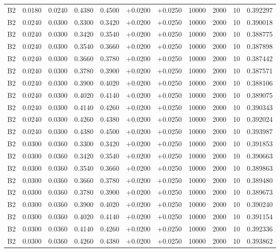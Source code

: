\documentclass{article}
\begin{document}
\begin{longtable}{l r r r r r r r r r l}
B2 & 0.0180 & 0.0240 & 0.4380 & 0.4500 & +0.0200 & +0.0250 & 10000 & 2000 & 10 & 0.392297 \\
B2 & 0.0240 & 0.0300 & 0.3300 & 0.3420 & +0.0200 & +0.0250 & 10000 & 2000 & 10 & 0.390018 \\
B2 & 0.0240 & 0.0300 & 0.3420 & 0.3540 & +0.0200 & +0.0250 & 10000 & 2000 & 10 & 0.388775 \\
B2 & 0.0240 & 0.0300 & 0.3540 & 0.3660 & +0.0200 & +0.0250 & 10000 & 2000 & 10 & 0.387898 \\
B2 & 0.0240 & 0.0300 & 0.3660 & 0.3780 & +0.0200 & +0.0250 & 10000 & 2000 & 10 & 0.387442 \\
B2 & 0.0240 & 0.0300 & 0.3780 & 0.3900 & +0.0200 & +0.0250 & 10000 & 2000 & 10 & 0.387571 \\
B2 & 0.0240 & 0.0300 & 0.3900 & 0.4020 & +0.0200 & +0.0250 & 10000 & 2000 & 10 & 0.388106 \\
B2 & 0.0240 & 0.0300 & 0.4020 & 0.4140 & +0.0200 & +0.0250 & 10000 & 2000 & 10 & 0.389075 \\
B2 & 0.0240 & 0.0300 & 0.4140 & 0.4260 & +0.0200 & +0.0250 & 10000 & 2000 & 10 & 0.390343 \\
B2 & 0.0240 & 0.0300 & 0.4260 & 0.4380 & +0.0200 & +0.0250 & 10000 & 2000 & 10 & 0.392024 \\
B2 & 0.0240 & 0.0300 & 0.4380 & 0.4500 & +0.0200 & +0.0250 & 10000 & 2000 & 10 & 0.393987 \\
B2 & 0.0300 & 0.0360 & 0.3300 & 0.3420 & +0.0200 & +0.0250 & 10000 & 2000 & 10 & 0.391853 \\
B2 & 0.0300 & 0.0360 & 0.3420 & 0.3540 & +0.0200 & +0.0250 & 10000 & 2000 & 10 & 0.390663 \\
B2 & 0.0300 & 0.0360 & 0.3540 & 0.3660 & +0.0200 & +0.0250 & 10000 & 2000 & 10 & 0.389863 \\
B2 & 0.0300 & 0.0360 & 0.3660 & 0.3780 & +0.0200 & +0.0250 & 10000 & 2000 & 10 & 0.389480 \\
B2 & 0.0300 & 0.0360 & 0.3780 & 0.3900 & +0.0200 & +0.0250 & 10000 & 2000 & 10 & 0.389673 \\
B2 & 0.0300 & 0.0360 & 0.3900 & 0.4020 & +0.0200 & +0.0250 & 10000 & 2000 & 10 & 0.390240 \\
B2 & 0.0300 & 0.0360 & 0.4020 & 0.4140 & +0.0200 & +0.0250 & 10000 & 2000 & 10 & 0.391154 \\
B2 & 0.0300 & 0.0360 & 0.4140 & 0.4260 & +0.0200 & +0.0250 & 10000 & 2000 & 10 & 0.392336 \\
B2 & 0.0300 & 0.0360 & 0.4260 & 0.4380 & +0.0200 & +0.0250 & 10000 & 2000 & 10 & 0.393862 \\

\end{longtable}
\end{document}
